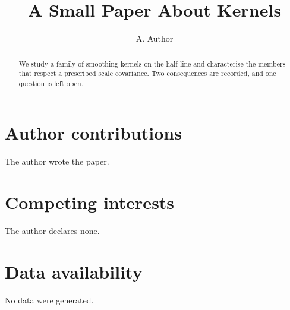 \documentclass[11pt]{article}
\title{A Small Paper About Kernels}
\author{A. Author}
\begin{document}
\maketitle

\begin{abstract}
We study a family of smoothing kernels on the half-line and characterise the members
that respect a prescribed scale covariance. Two consequences are recorded, and one
question is left open.
\end{abstract}



\section*{Author contributions}
The author wrote the paper.

\section*{Competing interests}
The author declares none.

\section*{Data availability}
No data were generated.




\end{document}
